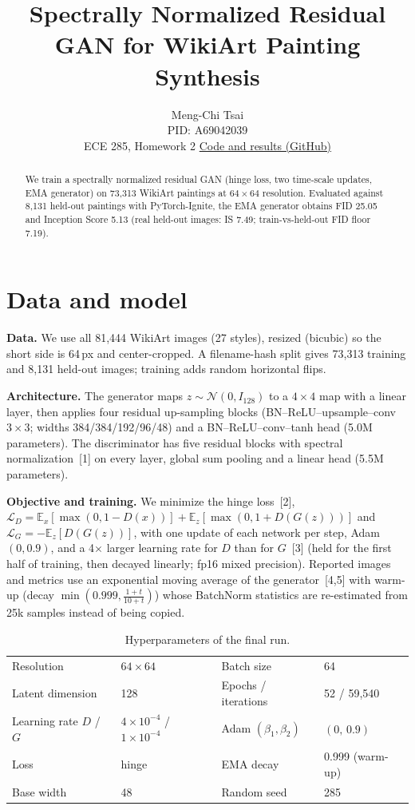 \documentclass{article}
\title{Spectrally Normalized Residual GAN for WikiArt Painting Synthesis}
\author{Meng-Chi Tsai \\ PID: A69042039 \\ ECE 285, Homework 2 \quad \href{https://github.com/moose1108/ece285-homeworks/tree/main/HW2}{Code and results (GitHub)}}
\begin{document}
\maketitle
\begin{abstract}
We train a spectrally normalized residual GAN (hinge loss, two time-scale updates, EMA generator) on
73{,}313 WikiArt paintings at $64\times64$ resolution. Evaluated against 8{,}131 held-out paintings with
PyTorch-Ignite, the EMA generator obtains FID 25.05 and Inception Score 5.13
(real held-out images: IS 7.49; train-vs-held-out FID floor 7.19).
\end{abstract}

\section{Data and model}
\textbf{Data.} We use all 81{,}444 WikiArt images (27 styles), resized (bicubic) so the short side is 64\,px and
center-cropped. A filename-hash split gives 73{,}313 training and 8{,}131 held-out images; training adds random horizontal flips.

\textbf{Architecture.} The generator maps $z\sim\mathcal N(0,I_{128})$ to a $4{\times}4$ map with a linear layer, then applies four residual
up-sampling blocks (BN--ReLU--upsample--conv$3{\times}3$; widths 384/384/192/96/48) and a BN--ReLU--conv--tanh head (5.0M parameters).
The discriminator has five residual blocks with spectral normalization~[1] on every layer, global sum pooling and a linear head (5.5M parameters).

\textbf{Objective and training.} We minimize the hinge loss~[2],
$\mathcal L_D=\mathbb E_x[\max(0,1-D(x))]+\mathbb E_z[\max(0,1+D(G(z)))]$ and $\mathcal L_G=-\mathbb E_z[D(G(z))]$,
with one update of each network per step, Adam$(0,0.9)$, and a 4$\times$ larger learning rate for $D$ than for $G$~[3]
(held for the first half of training, then decayed linearly; fp16 mixed precision).
Reported images and metrics use an exponential moving average of the generator~[4,5] with warm-up
(decay $\min(0.999,\frac{1+t}{10+t})$) whose BatchNorm statistics are re-estimated from 25k samples instead of being copied.

\begin{table}[!htb]
\centering\small
\caption{Hyperparameters of the final run.}
\begin{tabular}{ll@{\qquad}ll}
\toprule
Resolution & $64\times64$ & Batch size & 64 \\
Latent dimension & 128 & Epochs / iterations & 52 / 59{,}540 \\
Learning rate $D$ / $G$ & $4{\times}10^{-4}$ / $1{\times}10^{-4}$ & Adam $(\beta_1,\beta_2)$ & $(0,\,0.9)$ \\
Loss & hinge & EMA decay & 0.999 (warm-up) \\
Base width & 48 & Random seed & 285 \\
\bottomrule
\end{tabular}
\end{table}
\end{document}
